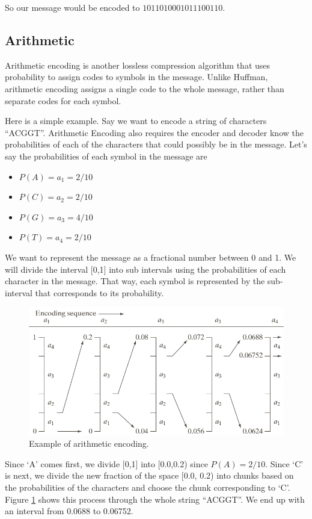 \documentclass[12pt,twoside]{reedthesis}
\providecommand{\tightlist}{%
  \setlength{\itemsep}{0pt}\setlength{\parskip}{0pt}}
\begin{document}
So our message would be encoded to \(1011010001011100110\).

\hypertarget{arithmetic}{%
\subsection{Arithmetic}\label{arithmetic}}

Arithmetic encoding is another lossless compression algorithm that uses probability to assign codes to symbols in the message. Unlike Huffman, arithmetic encoding assigns a single code to the whole message, rather than separate codes for each symbol.

Here is a simple example. Say we want to encode a string of characters ``ACGGT''. Arithmetic Encoding also requires the encoder and decoder know the probabilities of each of the characters that could possibly be in the message. Let's say the probabilities of each symbol in the message are
\begin{itemize}
\tightlist
\item
  \(P(A) = a_1 = 2/10\)
\item
  \(P(C) = a_2 = 2/10\)
\item
  \(P(G) = a_3 = 4/10\)
\item
  \(P(T) = a_4 = 2/10\)
\end{itemize}
We want to represent the message as a fractional number between 0 and 1. We will divide the interval {[}0,1{]} into sub intervals using the probabilities of each character in the message. That way, each symbol is represented by the sub-interval that corresponds to its probability.
\begin{figure}

{\centering \includegraphics[width=0.9\linewidth]{figure/arithmeticencoding} 

}

\caption{Example of arithmetic encoding.}\label{fig:arithmeticencoding}
\end{figure}
Since `A' comes first, we divide {[}0,1{]} into {[}0.0,0.2) since \(P(A) = 2/10\). Since `C' is next, we divide the new fraction of the space {[}0.0, 0.2) into chunks based on the probabilities of the characters and choose the chunk corresponding to `C'. Figure \ref{fig:arithmeticencoding} shows this process through the whole string ``ACGGT''. We end up with an interval from 0.0688 to 0.06752.
\end{document}
